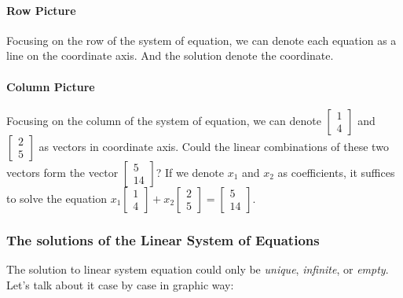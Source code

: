 \paragraph{Row Picture} Focusing on the row of the system of equation, we can denote each equation as a line on the coordinate axis. And the solution denote the coordinate.

\paragraph{Column Picture} Focusing on the column of the system of equation, we can denote 
$\begin{bmatrix}
1\\4
\end{bmatrix}$ and $\begin{bmatrix}
2\\5
\end{bmatrix}
$ as vectors in coordinate axis. {Could the linear combinations of these two vectors form the vector}
$\begin{bmatrix}
5\\14
\end{bmatrix}$?  If we denote $x_1$ and $x_2$ as coefficients, it suffices to solve the equation 
$
x_1\begin{bmatrix}
1\\4
\end{bmatrix} + x_2\begin{bmatrix}
2\\5
\end{bmatrix} = \begin{bmatrix}
5\\14
\end{bmatrix}$.

\subsubsection{The solutions of the Linear System of Equations}
The solution to linear system equation could only be \emph{unique}, \emph{infinite}, or \emph{empty}. Let's talk about it case by case in graphic way:
